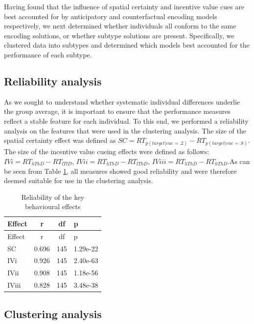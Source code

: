 \documentclass[11pt,halfline,a4paper,]{ouparticle}
\begin{document}
Having found that the influence of spatial certainty and incentive value cues are best accounted for by anticipatory and counterfactual encoding models respectively, we next determined whether individuals all conform to the same encoding solutions, or whether subtype solutions are present. Specifically, we clustered data into subtypes and determined which models best accounted for the performance of each subtype.

\hypertarget{reliability-analysis}{%
\subsection{Reliability analysis}\label{reliability-analysis}}

\label{sec:RelAnalysis}

As we sought to understand whether systematic individual differences underlie the group average, it is important to ensure that the performance measures reflect a stable feature for each individual. To this end, we performed a reliability analysis on the features that were used in the clustering analysis. The size of the spatial certainty effect was defined as \(SC = RT_{p(target|cue = .2)} - RT_{p(target|cue = .8)}\). The size of the incentive value cueing effects were defined as follows: \(IVi = RT_{hThD} - RT_{lTlD}\), \(IVii = RT_{hThD} - RT_{lThD}\), \(IViii = RT_{hThD} - RT_{hThD}\).As can be seen from Table \ref{tab:reliabilityanalysis}, all measures showed good reliability and were therefore deemed suitable for use in the clustering analysis.

\begin{longtable}[]{@{}lccl@{}}
\caption{\label{tab:reliabilityanalysis}Reliability of the key behavioural effects}\tabularnewline
\toprule
Effect & r & df & p\tabularnewline
\midrule
\endfirsthead
\toprule
Effect & r & df & p\tabularnewline
\midrule
\endhead
SC & 0.696 & 145 & 1.29e-22\tabularnewline
IVi & 0.926 & 145 & 2.40e-63\tabularnewline
IVii & 0.908 & 145 & 1.18e-56\tabularnewline
IViii & 0.828 & 145 & 3.48e-38\tabularnewline
\bottomrule
\end{longtable}

\hypertarget{clustering-analysis}{%
\subsection{Clustering analysis}\label{clustering-analysis}}

\label{sec:ClusAnalysis}
\end{document}
